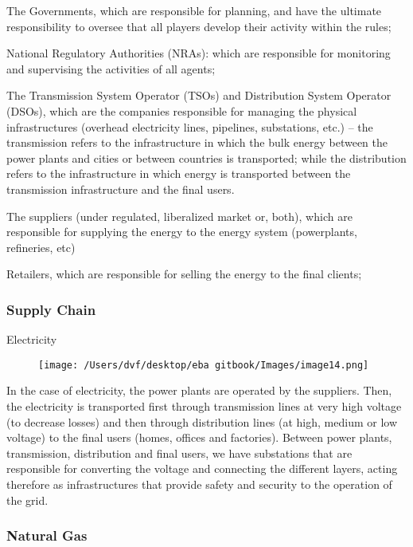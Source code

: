 \documentclass[]{book}
\theoremstyle{definition}
\theoremstyle{definition}
\theoremstyle{definition}
\theoremstyle{remark}
\begin{document}
The Governments, which are responsible for planning, and have the
ultimate responsibility to oversee that all players develop their
activity within the rules;

National Regulatory Authorities (NRAs): which are responsible for
monitoring and supervising the activities of all agents;

The Transmission System Operator (TSOs) and Distribution System Operator
(DSOs), which are the companies responsible for managing the physical
infrastructures (overhead electricity lines, pipelines, substations,
etc.) -- the transmission refers to the infrastructure in which the bulk
energy between the power plants and cities or between countries is
transported; while the distribution refers to the infrastructure in
which energy is transported between the transmission infrastructure and
the final users.

The suppliers (under regulated, liberalized market or, both), which are
responsible for supplying the energy to the energy system (powerplants,
refineries, etc)

Retailers, which are responsible for selling the energy to the final
clients;

\subsubsection{Supply Chain}\label{supply-chain}

Electricity

\begin{figure}[htbp]
\centering
\texttt{[image: /Users/dvf/desktop/eba gitbook/Images/image14.png]}
\caption{}
\end{figure}

In the case of electricity, the power plants are operated by the
suppliers. Then, the electricity is transported first through
transmission lines at very high voltage (to decrease losses) and then
through distribution lines (at high, medium or low voltage) to the final
users (homes, offices and factories). Between power plants,
transmission, distribution and final users, we have substations that are
responsible for converting the voltage and connecting the different
layers, acting therefore as infrastructures that provide safety and
security to the operation of the grid.

\subsubsection{Natural Gas}\label{natural-gas}
\end{document}
